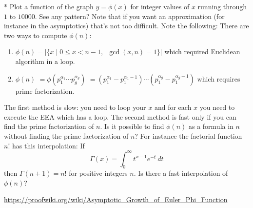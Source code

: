*
Plot a function of the graph $y = \phi(x)$ for integer values of $x$
running through $1$ to $10000$.
See any pattern? Note that if you want an approximation (for instance
in the asymptotics) that's not too difficult.
Note the following:
There are two ways to compute $\phi(n)$:
\begin{enumerate}[nosep,label=\textnormal{(\alph*)}]
\item $\phi(n) = |\{x \mid 0 \leq x < n - 1, \,\,\, \gcd(x, n) = 1\}|$
  which required Euclidean algorithm in a loop.
\item
  $\phi(n)$
  $= \phi(p_1^{\alpha_1} \cdots p_g^{\alpha_g})$
  $= (p_1^{\alpha_1} - p_1^{\alpha_1 - 1}) \cdots (p_1^{\alpha_g} - p_1^{\alpha_g - 1})$
  which requires prime factorization.
\end{enumerate}
The first method is slow: you need to loop your $x$ and for each $x$ you need to
execute the EEA which has a loop.
The second method is fast only if you can find the prime
factorization of $n$.
Is it possible to find $\phi(n)$ as a formula in $n$ without finding the
prime factorization of $n$?
For instance the factorial function $n!$ has this interpolation:
If
\[
\Gamma(x) = \int_0^\infty t^{x-1} e^{-t} \ dt
\]
then $\Gamma(n + 1) = n!$ for positive integers $n$.
Is there a fast interpolation of $\phi(n)$? 

\BEGINCOMMENT
\url{https://proofwiki.org/wiki/Asymptotic_Growth_of_Euler_Phi_Function}
\ENDCOMMENT
